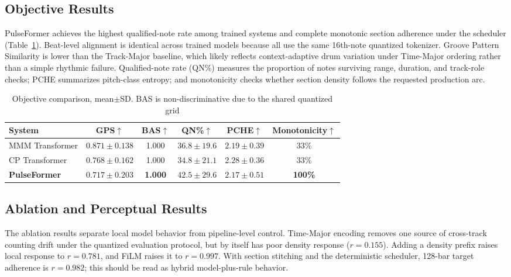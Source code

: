 \documentclass[conference]{conference-latex-template_10-17-19/IEEEtran}
\begin{document}
\subsection{Objective Results}
PulseFormer achieves the highest qualified-note rate among trained systems and complete monotonic section adherence under the scheduler (Table~\ref{tab:objective}). Beat-level alignment is identical across trained models because all use the same 16th-note quantized tokenizer. Groove Pattern Similarity is lower than the Track-Major baseline, which likely reflects context-adaptive drum variation under Time-Major ordering rather than a simple rhythmic failure. Qualified-note rate (QN\%) measures the proportion of notes surviving range, duration, and track-role checks; PCHE summarizes pitch-class entropy; and monotonicity checks whether section density follows the requested production arc.

\begin{table}[t]
\caption{Objective comparison, mean$\pm$SD. BAS is non-discriminative due to the shared quantized grid}
\label{tab:objective}
\centering\small
\begin{tabular}{@{}lccccc@{}}
\toprule
System & GPS$\uparrow$ & BAS$\uparrow$ & QN\%$\uparrow$ & PCHE$\uparrow$ & Monotonicity$\uparrow$ \\ \midrule
MMM Transformer & $\mathbf{0.871\pm0.138}$ & 1.000 & $36.8\pm19.6$ & $\mathbf{2.19\pm0.39}$ & 33\% \\
CP Transformer & $0.768\pm0.162$ & 1.000 & $34.8\pm21.1$ & $2.28\pm0.36$ & 33\% \\
\textbf{PulseFormer} & $0.717\pm0.203$ & \textbf{1.000} & $\mathbf{42.5\pm29.6}$ & $2.17\pm0.51$ & \textbf{100\%} \\ \bottomrule
\end{tabular}
\end{table}

\subsection{Ablation and Perceptual Results}
The ablation results separate local model behavior from pipeline-level control. Time-Major encoding removes one source of cross-track counting drift under the quantized evaluation protocol, but by itself has poor density response ($r=0.155$). Adding a density prefix raises local response to $r=0.781$, and FiLM raises it to $r=0.997$. With section stitching and the deterministic scheduler, 128-bar target adherence is $r=0.982$; this should be read as hybrid model-plus-rule behavior.
\end{document}
